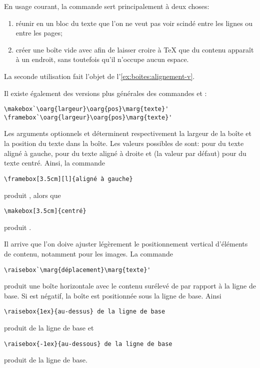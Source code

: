 En usage courant, la commande \cmd{\mbox} sert principalement à deux
choses:
\begin{enumerate}
\item réunir en un bloc du texte que l'on ne veut pas voir scindé
  entre les lignes ou entre les pages;
\item \label{item:boites:mbox} créer une boîte vide avec
   afin de laisser croire à {\TeX} que du contenu
  apparaît à un endroit, sans toutefois qu'il n'occupe aucun espace.
\end{enumerate}
La seconde utilisation fait l'objet de
l'\autoref{ex:boites:alignement-v}.

Il existe également des versions plus générales des commandes
\cmd{\mbox} et \cmd{\fbox}:
\begin{lstlisting}
\makebox`\oarg{largeur}\oarg{pos}\marg{texte}'
\framebox`\oarg{largeur}\oarg{pos}\marg{texte}'
\end{lstlisting}
Les arguments optionnels  et  déterminent
respectivement la largeur de la boîte et la position du texte
dans la boîte. Les valeurs possibles de  sont:  pour
du texte aligné à gauche,  pour du texte aligné à droite et
 (la valeur par défaut) pour du texte centré. Ainsi, la commande
\begin{lstlisting}
\framebox[3.5cm][l]{aligné à gauche}
\end{lstlisting}
produit , alors que
\begin{lstlisting}
\makebox[3.5cm]{centré}
\end{lstlisting}
produit .

Il arrive que l'on doive ajuster légèrement le positionnement vertical
d'éléments de contenu, notamment pour les images. La commande
\begin{lstlisting}
\raisebox`\marg{déplacement}\marg{texte}'
\end{lstlisting}
produit une boîte horizontale avec le contenu  surélevé de
 par rapport à la ligne de base. Si
 est négatif, la boîte est positionnée sous la ligne
de base. Ainsi
\begin{lstlisting}
\raisebox{1ex}{au-dessus} de la ligne de base
\end{lstlisting}
produit  \raisebox{1ex}{au-dessus} de la ligne de base et
\begin{lstlisting}
\raisebox{-1ex}{au-dessous} de la ligne de base
\end{lstlisting}
produit \raisebox{-1ex}{au-dessous} de la ligne de base.

